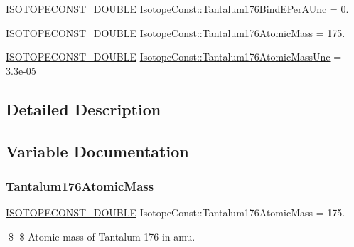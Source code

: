 \begin{DoxyCompactItemize}
\mbox{\hyperlink{group___isotope_const-_macros_ga8f45a7272ce02c0b4c65c44636ed719a}{I\+S\+O\+T\+O\+P\+E\+C\+O\+N\+S\+T\+\_\+\+D\+O\+U\+B\+LE}} \mbox{\hyperlink{group___isotope_const-_tantalum-_ta176_gaef6b56f90b7c50ceec55c8f3642f2113}{Isotope\+Const\+::\+Tantalum176\+Bind\+E\+Per\+A\+Unc}} = 0.
\item 
\mbox{\hyperlink{group___isotope_const-_macros_ga8f45a7272ce02c0b4c65c44636ed719a}{I\+S\+O\+T\+O\+P\+E\+C\+O\+N\+S\+T\+\_\+\+D\+O\+U\+B\+LE}} \mbox{\hyperlink{group___isotope_const-_tantalum-_ta176_ga0f8aaf58ec6f6fb64c8b26b5b08c4ac7}{Isotope\+Const\+::\+Tantalum176\+Atomic\+Mass}} = 175.
\item 
\mbox{\hyperlink{group___isotope_const-_macros_ga8f45a7272ce02c0b4c65c44636ed719a}{I\+S\+O\+T\+O\+P\+E\+C\+O\+N\+S\+T\+\_\+\+D\+O\+U\+B\+LE}} \mbox{\hyperlink{group___isotope_const-_tantalum-_ta176_gae1b869058bc74e71c8ecb8c4f4eddcce}{Isotope\+Const\+::\+Tantalum176\+Atomic\+Mass\+Unc}} = 3.\+3e-\/05
\end{DoxyCompactItemize}


\subsection{Detailed Description}


\subsection{Variable Documentation}
\mbox{\label{group___isotope_const-_tantalum-_ta176_ga0f8aaf58ec6f6fb64c8b26b5b08c4ac7}} 
\subsubsection{\texorpdfstring{Tantalum176\+Atomic\+Mass}{Tantalum176AtomicMass}}
{\footnotesize\ttfamily \mbox{\hyperlink{group___isotope_const-_macros_ga8f45a7272ce02c0b4c65c44636ed719a}{I\+S\+O\+T\+O\+P\+E\+C\+O\+N\+S\+T\+\_\+\+D\+O\+U\+B\+LE}} Isotope\+Const\+::\+Tantalum176\+Atomic\+Mass = 175.}

\$ \$ Atomic mass of Tantalum-\/176 in amu. \mbox{\label{group___isotope_const-_tantalum-_ta176_gae1b869058bc74e71c8ecb8c4f4eddcce}} 
